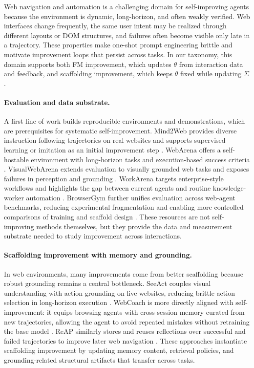 \documentclass{article}
\begin{document}
Web navigation and automation is a challenging domain for self-improving agents because the environment is dynamic, long-horizon, and often weakly verified. Web interfaces change frequently, the same user intent may be realized through different layouts or DOM structures, and failures often become visible only late in a trajectory. These properties make one-shot prompt engineering brittle and motivate improvement loops that persist across tasks. In our taxonomy, this domain supports both FM improvement, which updates $\theta$ from interaction data and feedback, and scaffolding improvement, which keeps $\theta$ fixed while updating $\Sigma$.

\paragraph{Evaluation and data substrate.}
A first line of work builds reproducible environments and demonstrations, which are prerequisites for systematic self-improvement. Mind2Web provides diverse instruction-following trajectories on real websites and supports supervised learning or imitation as an initial improvement step \citep{deng2023mindweb}. WebArena offers a self-hostable environment with long-horizon tasks and execution-based success criteria \citep{zhou2024webarena}. VisualWebArena extends evaluation to visually grounded web tasks and exposes failures in perception and grounding \citep{koh2024visualwebarenaevaluatingmultimodalagents}. WorkArena targets enterprise-style workflows and highlights the gap between current agents and routine knowledge-worker automation \citep{drouin2024workarenacapablewebagents}. BrowserGym further unifies evaluation across web-agent benchmarks, reducing experimental fragmentation and enabling more controlled comparisons of training and scaffold design \citep{workarena2024, chezelles2025browsergym}. These resources are not self-improving methods themselves, but they provide the data and measurement substrate needed to study improvement across interactions.

\paragraph{Scaffolding improvement with memory and grounding.}
In web environments, many improvements come from better scaffolding because robust grounding remains a central bottleneck. SeeAct couples visual understanding with action grounding on live websites, reducing brittle action selection in long-horizon execution \citep{zheng2024gptvision}. WebCoach is more directly aligned with self-improvement: it equips browsing agents with cross-session memory curated from new trajectories, allowing the agent to avoid repeated mistakes without retraining the base model \citep{liu2025webcoachselfevolvingwebagents}. ReAP similarly stores and reuses reflections over successful and failed trajectories to improve later web navigation \citep{azam2025reflectionbasedmemorywebnavigation}. These approaches instantiate scaffolding improvement by updating memory content, retrieval policies, and grounding-related structural artifacts that transfer across tasks.
\end{document}

